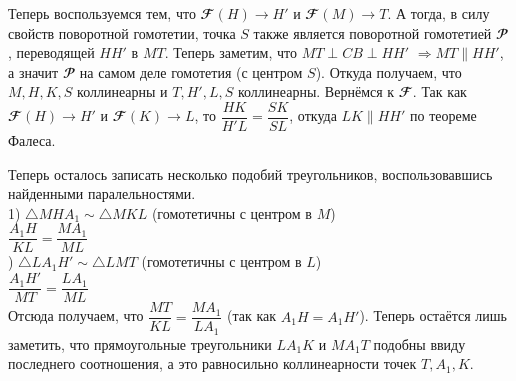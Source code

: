 \documentclass[14pt]{extarticle}
\newcommand{\F}{\mathbfcal{F}}
\renewcommand{\P}{\mathbfcal{P}}
\begin{document}
Теперь воспользуемся тем, что \(\F(H) \rightarrow H'\) и 
\(\F(M) \rightarrow T\). А тогда, в силу свойств поворотной 
гомотетии, точка \(S\) также является поворотной гомотетией 
\(\P\), переводящей \(HH'\) в \(MT\). Теперь заметим, что 
\(MT \perp CB \perp HH'\) \(\Rightarrow MT \parallel HH'\), 
а значит \(\P\) на самом деле гомотетия (с центром \(S\)). 
Откуда получаем, что \(M, H, K, S\) коллинеарны и 
\(T, H', L, S\) коллинеарны. Вернёмся к \(\F\). Так как 
\(\F(H) \rightarrow H'\) и \(\F(K) \rightarrow L\), то 
\(\dfrac{HK}{H'L} = \dfrac{SK}{SL}\), откуда \(LK \parallel 
HH'\) по теореме Фалеса.

Теперь осталось записать несколько подобий треугольников, 
воспользовавшись найденными паралельностями.\\
1) \(\triangle MHA_1 \sim \triangle MKL\) (гомотетичны с 
центром в \(M\))\\
\indent \(\dfrac{A_1H}{KL} = \dfrac{MA_1}{ML}\)\\

) \(\triangle LA_1H' \sim \triangle LMT\) 
(гомотетичны с центром в \(L\))\\
\indent \(\dfrac{A_1H'}{MT} = \dfrac{LA_1}{ML}\)\\

\noindent Отсюда получаем, что \(\dfrac{MT}{KL} = 
\dfrac{MA_1}{LA_1}\) (так как \(A_1H = A_1H'\)). 
Теперь остаётся лишь заметить, что прямоугольные треугольники 
\(LA_1K\) и \(MA_1T\) подобны ввиду последнего соотношения, 
а это равносильно коллинеарности точек \(T, A_1, K\).
\end{document}
